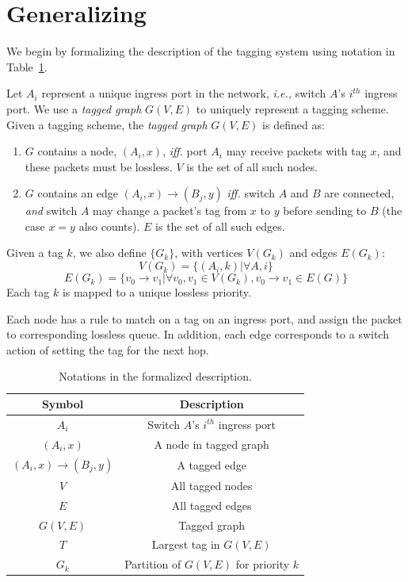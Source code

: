 \section{Generalizing \sysname{}}
\label{sec:generic}

We begin by  formalizing the description of the tagging system using notation in
Table~\ref{tab:symbols}.

Let $A_i$ represent a unique ingress port in the network, {\em i.e.,} switch
$A$'s $i^{th}$ ingress port.  We use a {\em tagged graph} $G(V,E)$ to uniquely
represent a tagging scheme.  Given a tagging scheme, the {\em tagged graph}
$G(V,E)$ is defined as:

\begin{enumerate}
\item $G$ contains a node, $(A_i, x)$, {\em iff.} port $A_i$ may receive packets with tag $x$, and these packets must
be lossless. $V$ is the set of all such nodes.

\item $G$ contains an edge $(A_i, x)\rightarrow(B_j, y)$ {\em iff.} switch $A$ and $B$ are
connected, {\em and} switch $A$ may change a packet's tag from $x$ to $y$ before sending to $B$ (the case $x=y$ also counts).
$E$ is the set of all such edges.

\end{enumerate}

Given a tag $k$, we also define $\{G_k\}$, with vertices $V(G_k)$ and edges
$E(G_k)$:
$$V(G_k) = \{(A_i, k) | \forall A, i\} $$
$$E(G_k) = \{v_0 \rightarrow v_1 | \forall v_0, v_1 \in V(G_k),  v_0 \rightarrow v_1 \in E(G)\} $$
Each tag $k$ is mapped to a unique lossless priority.

Each node has a rule to match on a tag on an ingress port, and assign the packet
to corresponding lossless queue.  In addition, each edge corresponds to a switch
action of setting the tag for the next hop.

\begin{table}[t]
\footnotesize
\centering
\begin{tabular}{|c|c|}
\hline
Symbol & Description \\ \hline
$A_i$ & Switch $A$'s $i^{th}$ ingress port  \\ \hline
$(A_i, x)$ & A node in tagged graph \\ \hline
$(A_i, x)\rightarrow(B_j, y)$ & A tagged edge \\ \hline
$V$ & All tagged nodes  \\ \hline
$E$ & All tagged edges \\ \hline
$G(V, E)$ & Tagged graph \\ \hline
$T$ & Largest tag in $G(V,E)$ \\ \hline
$G_k$ & Partition of $G(V,E)$ for priority $k$ \\ \hline
\end{tabular}
\caption{Notations in the formalized description.}
\label{tab:symbols}
		\vspace{-3em}
\end{table}

